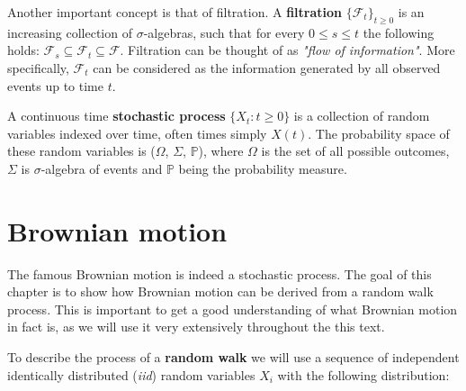 \documentclass[times, utf8, diplomski]{fer}
\begin{document}
Another important concept is that of filtration. A \textbf{filtration} $\{\mathcal{F}_t\}_{t\ge 0}$ is an increasing collection of $\sigma$-algebras, such that for every $0 \le s \le t$ the following holds: $\mathcal{F}_s \subseteq \mathcal{F}_t \subseteq \mathcal{F}$. Filtration can be thought of as \textit{"flow of information"}. More specifically, $\mathcal{F}_t$ can be considered as the information generated by all observed events up to time $t$.

\begin{definition}
	A continuous time \textbf{stochastic process} $\{X_t: t\ge 0\}$ is a collection of random variables indexed over time, often times simply $X(t)$. The probability space of these random variables is ($\Omega$, $\Sigma$, $\mathbb{P}$), where $\Omega$ is the set of all possible outcomes, $\Sigma$ is $\sigma$-algebra of events and $\mathbb{P}$ being the probability measure.
\end{definition}


\section{Brownian motion}
The famous Brownian motion is indeed a stochastic process. The goal of this chapter is to show how Brownian motion can be derived from a random walk process. This is important to get a good understanding of what Brownian motion in fact is, as we will use it very extensively throughout the this text.

\noindent To describe the process of a \textbf{random walk} we will use a sequence of independent identically distributed (\textit{iid}) random variables $X_i$ with the following distribution:
\end{document}
